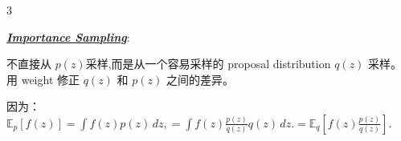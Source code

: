 \documentclass[12pt]{article}
\newcommand{\bulletPoint}[1]{\underline{\textit{\textbf{#1}}}}
\begin{document}
\begin{multicols*}{3}







\bulletPoint{Importance Sampling}:

不直接从 $p(z)$采样,而是从一个容易采样的 proposal distribution $q(z)$ 采样。用 weight 修正 $q(z)$ 和 $p(z)$ 之间的差异。

因为：
$
\mathbb E_p[f(z)]
=
\int f(z)p(z)\,dz,
=
\int f(z)\frac{p(z)}{q(z)}q(z)\,dz.
=
\mathbb E_q\left[
f(z)\frac{p(z)}{q(z)}
\right].
$


\end{multicols*}
\end{document}
